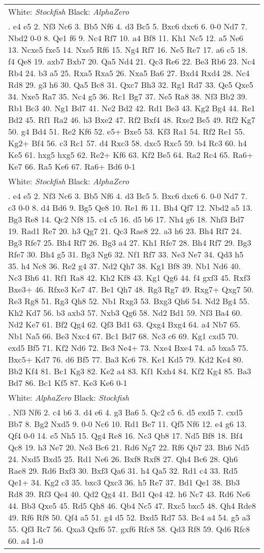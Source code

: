 \documentclass[12pt]{article}
\begin{document}
\begin{small}
\begin{longtable}{p{\textwidth}}
\hline
White: \emph{Stockfish} Black: \emph{AlphaZero} \\\nopagebreak
1. e4 e5 2. Nf3 Nc6 3. Bb5 Nf6 4. d3 Bc5 5. Bxc6 dxc6 6. 0-0 Nd7 7. Nbd2 0-0 8. Qe1 f6 9. Nc4 Rf7 10. a4 Bf8 11. Kh1 Nc5 12. a5 Ne6 13. Ncxe5 fxe5 14. Nxe5 Rf6 15. Ng4 Rf7 16. Ne5 Re7 17. a6 c5 18. f4 Qe8 19. axb7 Bxb7 20. Qa5 Nd4 21. Qc3 Re6 22. Be3 Rb6 23. Nc4 Rb4 24. b3 a5 25. Rxa5 Rxa5 26. Nxa5 Ba6 27. Bxd4 Rxd4 28. Nc4 Rd8 29. g3 h6 30. Qa5 Bc8 31. Qxc7 Bh3 32. Rg1 Rd7 33. Qe5 Qxe5 34. Nxe5 Ra7 35. Nc4 g5 36. Rc1 Bg7 37. Ne5 Ra8 38. Nf3 Bb2 39. Rb1 Bc3 40. Ng1 Bd7 41. Ne2 Bd2 42. Rd1 Be3 43. Kg2 Bg4 44. Re1 Bd2 45. Rf1 Ra2 46. h3 Bxe2 47. Rf2 Bxf4 48. Rxe2 Be5 49. Rf2 Kg7 50. g4 Bd4 51. Re2 Kf6 52. e5+ Bxe5 53. Kf3 Ra1 54. Rf2 Re1 55. Kg2+ Bf4 56. c3 Rc1 57. d4 Rxc3 58. dxc5 Rxc5 59. b4 Rc3 60. h4 Ke5 61. hxg5 hxg5 62. Re2+ Kf6 63. Kf2 Be5 64. Ra2 Rc4 65. Ra6+ Ke7 66. Ra5 Ke6 67. Ra6+ Bd6 0-1 \\
\hline
White: \emph{Stockfish} Black: \emph{AlphaZero} \\\nopagebreak
1. e4 e5 2. Nf3 Nc6 3. Bb5 Nf6 4. d3 Bc5 5. Bxc6 dxc6 6. 0-0 Nd7 7. c3 0-0 8. d4 Bd6 9. Bg5 Qe8 10. Re1 f6 11. Bh4 Qf7 12. Nbd2 a5 13. Bg3 Re8 14. Qc2 Nf8 15. c4 c5 16. d5 b6 17. Nh4 g6 18. Nhf3 Bd7 19. Rad1 Re7 20. h3 Qg7 21. Qc3 Rae8 22. a3 h6 23. Bh4 Rf7 24. Bg3 Rfe7 25. Bh4 Rf7 26. Bg3 a4 27. Kh1 Rfe7 28. Bh4 Rf7 29. Bg3 Rfe7 30. Bh4 g5 31. Bg3 Ng6 32. Nf1 Rf7 33. Ne3 Ne7 34. Qd3 h5 35. h4 Nc8 36. Re2 g4 37. Nd2 Qh7 38. Kg1 Bf8 39. Nb1 Nd6 40. Nc3 Bh6 41. Rf1 Ra8 42. Kh2 Kf8 43. Kg1 Qg6 44. f4 gxf3 45. Rxf3 Bxe3+ 46. Rfxe3 Ke7 47. Be1 Qh7 48. Rg3 Rg7 49. Rxg7+ Qxg7 50. Re3 Rg8 51. Rg3 Qh8 52. Nb1 Rxg3 53. Bxg3 Qh6 54. Nd2 Bg4 55. Kh2 Kd7 56. b3 axb3 57. Nxb3 Qg6 58. Nd2 Bd1 59. Nf3 Ba4 60. Nd2 Ke7 61. Bf2 Qg4 62. Qf3 Bd1 63. Qxg4 Bxg4 64. a4 Nb7 65. Nb1 Na5 66. Be3 Nxc4 67. Bc1 Bd7 68. Nc3 c6 69. Kg1 cxd5 70. exd5 Bf5 71. Kf2 Nd6 72. Be3 Ne4+ 73. Nxe4 Bxe4 74. a5 bxa5 75. Bxc5+ Kd7 76. d6 Bf5 77. Ba3 Kc6 78. Ke1 Kd5 79. Kd2 Ke4 80. Bb2 Kf4 81. Bc1 Kg3 82. Ke2 a4 83. Kf1 Kxh4 84. Kf2 Kg4 85. Ba3 Bd7 86. Bc1 Kf5 87. Ke3 Ke6 0-1 \\
\hline
White: \emph{AlphaZero} Black: \emph{Stockfish} \\\nopagebreak
1. Nf3 Nf6 2. c4 b6 3. d4 e6 4. g3 Ba6 5. Qc2 c5 6. d5 exd5 7. cxd5 Bb7 8. Bg2 Nxd5 9. 0-0 Nc6 10. Rd1 Be7 11. Qf5 Nf6 12. e4 g6 13. Qf4 0-0 14. e5 Nh5 15. Qg4 Re8 16. Nc3 Qb8 17. Nd5 Bf8 18. Bf4 Qc8 19. h3 Ne7 20. Ne3 Bc6 21. Rd6 Ng7 22. Rf6 Qb7 23. Bh6 Nd5 24. Nxd5 Bxd5 25. Rd1 Ne6 26. Bxf8 Rxf8 27. Qh4 Bc6 28. Qh6 Rae8 29. Rd6 Bxf3 30. Bxf3 Qa6 31. h4 Qa5 32. Rd1 c4 33. Rd5 Qe1+ 34. Kg2 c3 35. bxc3 Qxc3 36. h5 Re7 37. Bd1 Qe1 38. Bb3 Rd8 39. Rf3 Qe4 40. Qd2 Qg4 41. Bd1 Qe4 42. h6 Nc7 43. Rd6 Ne6 44. Bb3 Qxe5 45. Rd5 Qh8 46. Qb4 Nc5 47. Rxc5 bxc5 48. Qh4 Rde8 49. Rf6 Rf8 50. Qf4 a5 51. g4 d5 52. Bxd5 Rd7 53. Bc4 a4 54. g5 a3 55. Qf3 Rc7 56. Qxa3 Qxf6 57. gxf6 Rfc8 58. Qd3 Rf8 59. Qd6 Rfc8 60. a4 1-0 \\

\end{longtable}
\end{small}
\end{document}
